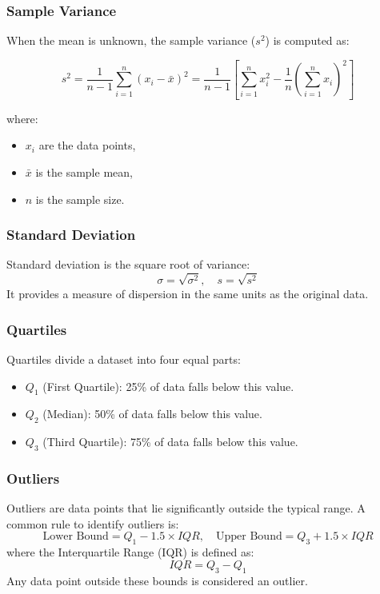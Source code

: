 \documentclass[a4paper,12pt]{article}
\begin{document}
\subsubsection{Sample Variance}
When the mean is unknown, the sample variance (\(s^2\)) is computed as:

\begin{equation}
s^2 = \frac{1}{n-1} \sum_{i=1}^{n} (x_i - \bar{x})^2 
    = \frac{1}{n-1} \left[ \sum_{i=1}^{n} x_i^2 - \frac{1}{n} \left( \sum_{i=1}^{n} x_i \right)^2 \right]
\end{equation}

where:
\begin{itemize}
    \item \( x_i \) are the data points,
    \item \( \bar{x} \) is the sample mean,
    \item \( n \) is the sample size.
\end{itemize}


\subsubsection{Standard Deviation}
Standard deviation is the square root of variance:
\begin{equation}
\sigma = \sqrt{\sigma^2}, \quad s = \sqrt{s^2}
\end{equation}
It provides a measure of dispersion in the same units as the original data.

\subsubsection{Quartiles}
Quartiles divide a dataset into four equal parts:
\begin{itemize}
    \item \( Q_1 \) (First Quartile): 25\% of data falls below this value.
    \item \( Q_2 \) (Median): 50\% of data falls below this value.
    \item \( Q_3 \) (Third Quartile): 75\% of data falls below this value.
\end{itemize}

\subsubsection{Outliers}
Outliers are data points that lie significantly outside the typical range. A common rule to identify outliers is:
\begin{equation}
\text{Lower Bound} = Q_1 - 1.5 \times IQR, \quad \text{Upper Bound} = Q_3 + 1.5 \times IQR
\end{equation}
where the Interquartile Range (IQR) is defined as:
\begin{equation}
IQR = Q_3 - Q_1
\end{equation}
Any data point outside these bounds is considered an outlier.
\end{document}
